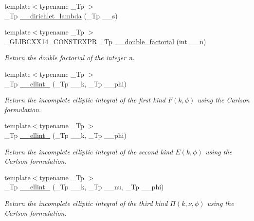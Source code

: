 \begin{DoxyCompactItemize}
\item 
{\footnotesize template$<$typename \+\_\+\+Tp $>$ }\\\+\_\+\+Tp \hyperlink{namespacestd_1_1____detail_a6ee8ae93ba65207de8ef3d6bb162b192}{\+\_\+\+\_\+dirichlet\+\_\+lambda} (\+\_\+\+Tp \+\_\+\+\_\+s)
\item 
{\footnotesize template$<$typename \+\_\+\+Tp $>$ }\\\+\_\+\+G\+L\+I\+B\+C\+X\+X14\+\_\+\+C\+O\+N\+S\+T\+E\+X\+PR \+\_\+\+Tp \hyperlink{namespacestd_1_1____detail_a06b0d9786afff0919c96f61d5f760c5f}{\+\_\+\+\_\+double\+\_\+factorial} (int \+\_\+\+\_\+n)
\begin{DoxyCompactList}\small\item\em Return the double factorial of the integer n. \end{DoxyCompactList}\item 
{\footnotesize template$<$typename \+\_\+\+Tp $>$ }\\\+\_\+\+Tp \hyperlink{namespacestd_1_1____detail_aa349fe5bcf36d29cfacf6cd3e8aa65b0}{\+\_\+\+\_\+ellint\+\_} (\+\_\+\+Tp \+\_\+\+\_\+k, \+\_\+\+Tp \+\_\+\+\_\+phi)
\begin{DoxyCompactList}\small\item\em Return the incomplete elliptic integral of the first kind $ F(k,\phi) $ using the Carlson formulation. \end{DoxyCompactList}\item 
{\footnotesize template$<$typename \+\_\+\+Tp $>$ }\\\+\_\+\+Tp \hyperlink{namespacestd_1_1____detail_ad3687a38e74e5fbf08265501add0b56a}{\+\_\+\+\_\+ellint\+\_} (\+\_\+\+Tp \+\_\+\+\_\+k, \+\_\+\+Tp \+\_\+\+\_\+phi)
\begin{DoxyCompactList}\small\item\em Return the incomplete elliptic integral of the second kind $ E(k,\phi) $ using the Carlson formulation. \end{DoxyCompactList}\item 
{\footnotesize template$<$typename \+\_\+\+Tp $>$ }\\\+\_\+\+Tp \hyperlink{namespacestd_1_1____detail_a9c6ea96cd5d6907fce278010b992499a}{\+\_\+\+\_\+ellint\+\_} (\+\_\+\+Tp \+\_\+\+\_\+k, \+\_\+\+Tp \+\_\+\+\_\+nu, \+\_\+\+Tp \+\_\+\+\_\+phi)
\begin{DoxyCompactList}\small\item\em Return the incomplete elliptic integral of the third kind $ \Pi(k,\nu,\phi) $ using the Carlson formulation. \end{DoxyCompactList}\item 

\end{DoxyCompactItemize}
